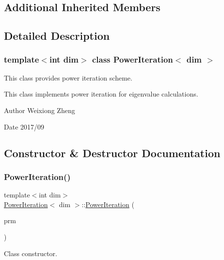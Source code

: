 \subsection*{Additional Inherited Members}


\subsection{Detailed Description}
\subsubsection*{template$<$int dim$>$\newline
class Power\+Iteration$<$ dim $>$}

This class provides power iteration scheme. 

This class implements power iteration for eigenvalue calculations.

\begin{DoxyAuthor}{Author}
Weixiong Zheng 
\end{DoxyAuthor}
\begin{DoxyDate}{Date}
2017/09 
\end{DoxyDate}


\subsection{Constructor \& Destructor Documentation}
\mbox{\label{class_power_iteration_a2608445223ce7d27b24be0f9d7042554}} 
\subsubsection{\texorpdfstring{Power\+Iteration()}{PowerIteration()}}
{\footnotesize\ttfamily template$<$int dim$>$ \\
\hyperlink{class_power_iteration}{Power\+Iteration}$<$ dim $>$\+::\hyperlink{class_power_iteration}{Power\+Iteration} (\begin{DoxyParamCaption}\item[{const Parameter\+Handler \&}]{prm }\end{DoxyParamCaption})}



Class constructor. 

\mbox{\label{class_power_iteration_ad660a351afc4f23b1bcf7b334ef033dd}} 
